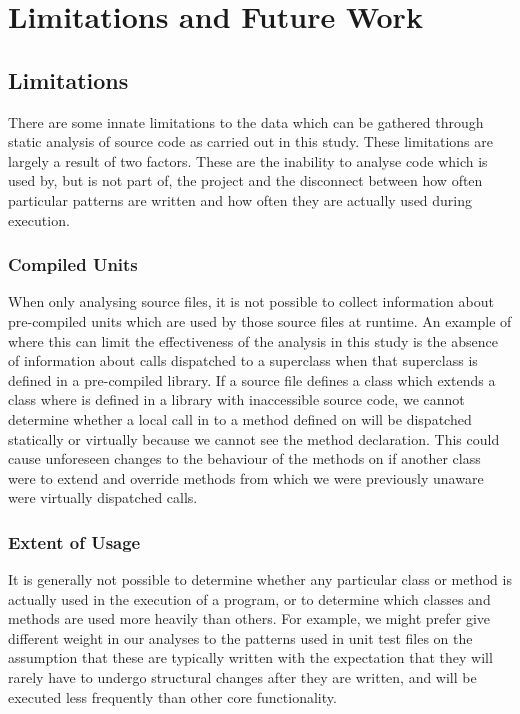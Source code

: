 \chapter{Limitations and Future Work}\label{C:future}

\section{Limitations}
There are some innate limitations to the data which can be gathered through static analysis of source code as carried out in this study. These limitations are largely a result of two factors. These are the inability to analyse code which is used by, but is not part of, the project and the disconnect between how often particular patterns are written and how often they are actually used during execution.

\subsection{Compiled Units}
When only analysing source files, it is not possible to collect information about pre-compiled units which are used by those source files at runtime. An example of where this can limit the effectiveness of the analysis in this study is the absence of information about calls dispatched to a superclass when that superclass is defined in a pre-compiled library. If a source file defines a class  which extends a class  where  is defined in a library with inaccessible source code, we cannot determine whether a local call in  to a method defined on  will be dispatched statically or virtually because we cannot see the method declaration. This could cause unforeseen changes to the behaviour of the methods on  if another class  were to extend  and override methods from  which we were previously unaware were virtually dispatched calls.

\subsection{Extent of Usage}
It is generally not possible to determine whether any particular class or method is actually used in the execution of a program, or to determine which classes and methods are used more heavily than others. For example, we might prefer give different weight in our analyses to the patterns used in unit test files on the assumption that these are typically written with the expectation that they will rarely have to undergo structural changes after they are written, and will be executed less frequently than other core functionality.

